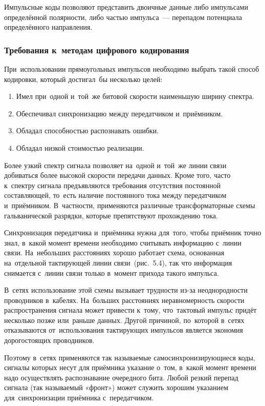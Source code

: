 \documentclass[
	a4paper,
	oneside,
	BCOR = 10mm,
	DIV = 12,
	12pt,
	headings = normal,
]{scrartcl}
\begin{document}
					Импульсные коды позволяют представить двоичные данные либо импульсами определённой полярности, либо частью импульса~— перепадом потенциала определённого направления. 

				\subsubsection{Требования к~методам цифрового кодирования}
					При~использовании прямоугольных импульсов необходимо выбрать такой способ кодировки, который достигал~бы несколько целей:
					\begin{enumerate}
						\item Имел при~одной и~той~же битовой скорости наименьшую ширину спектра.
						\item Обеспечивал синхронизацию между передатчиком и~приёмником.
						\item Обладал способностью распознавать ошибки.
						\item Обладал низкой стоимостью реализации.
					\end{enumerate}

					Более узкий спектр сигнала позволяет на~одной и~той~же линии связи добиваться более высокой скорости передачи данных. Кроме того, часто к~спектру сигнала предъявляются требования отсутствия постоянной составляющей, то~есть наличие постоянного тока между передатчиком и~приёмником. В~частности, применяются различные трансформаторные схемы гальванической разрядки, которые препятствуют прохождению тока.

					Синхронизация передатчика и~приёмника нужна для~того, чтобы приёмник точно знал, в~какой момент времени необходимо считывать информацию с~линии связи. На~небольших расстояниях хорошо работает схема, основанная на~отдельной тактирующей линии связи~(рис.~5.4), так что информация снимается с~линии связи только в~момент прихода такого импульса.
					
					В~сетях использование этой схемы вызывает трудности из-за неоднородности проводников в~кабелях. На~больших расстояниях неравномерность скорости распространения сигнала может привести к~тому, что~тактовый импульс придёт несколько позже или~раньше данных. Другой причиной, по~которой в~сетях отказываются от~использования тактирующих импульсов является экономия дорогостоящих проводников.

					Поэтому в~сетях применяются так называемые самосинхронизирующиеся коды, сигналы которых несут для приёмника указание о~том, в~какой момент времени надо осуществлять распознавание очередного бита. Любой резкий перепад сигнала (так называемый «фронт») может служить хорошим указанием для~синхронизации приёмника с~передатчиком. 
\end{document}
